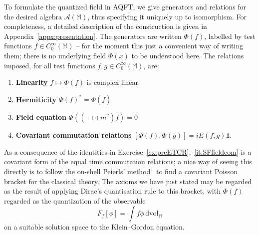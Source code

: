 \documentclass[12pt,a4paper]{article}
\newcommand{\1}{\mathds{1}}                         %
\newcommand{\MM}{\mathbb{M}}
\newcommand{\II}{{\mathbb{1}}}
\newcommand{\Ac}{{\mathcal{A}}}
\newcommand{\dvol}{{\textrm{dvol}}}
\newcommand{\CoinX}[1]{C_0^\infty(#1)}
\begin{document}
	To formulate the quantized field in AQFT, we give generators and relations for the desired algebra $\Ac(\MM)$, thus specifying it uniquely up to isomorphism. For completeness, a detailed description of the construction is given in Appendix~\ref{appx:presentation}. The generators are written $\Phi(f)$, labelled by test functions $f\in \CoinX{\MM}$ -- for the moment this just a convenient way of writing them; there is no underlying field $\Phi(x)$ to be understood here. The relations imposed, for all test functions $f,g\in\CoinX{\MM}$, are:
	\begin{enumerate}[label=\bf SF\arabic{enumi},leftmargin=*,widest=4] 
		\item\label{it:SFfieldlin} {\bf Linearity} $f\mapsto \Phi(f)$ is complex linear 
		\item {\bf Hermiticity} \label{it:SFfieldcong} $\Phi(f)^*=\Phi(\overline{f})$
		\item\label{it:SFfieldeq} {\bf Field equation}  $\Phi((\Box+ m^2)f)= 0$
		\item\label{it:SFfieldcom} {\bf Covariant commutation relations} $[\Phi(f),\Phi(g)] = iE (f,g)\II$.
	\end{enumerate}
As a consequence of the identities in Exercise~\ref{ex:preETCR},~\ref{it:SFfieldcom} is a covariant form of the equal time commutation relations; a nice way of seeing this directly is to follow the on-shell Peierls' method~\cite{Peierls:1952} to find a covariant Poisson bracket for the classical theory. The axioms we have just stated may be regarded as the result of applying Dirac's quantisation rule to this bracket, with $\Phi(f)$ regarded as the quantization of the observable
	\begin{equation}
	F_f[\phi]=\int f\phi\,\dvol_\MM
	\end{equation} 
	on a suitable solution space to the Klein--Gordon equation.  
	
\end{document}

